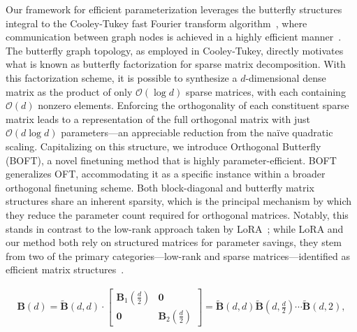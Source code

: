 Our framework for efficient parameterization leverages the butterfly structures integral to the Cooley-Tukey fast Fourier transform algorithm~\cite{cooley1965algorithm}, where communication between graph nodes is achieved in a highly efficient manner~\cite{klasing1994broadcasting}. The butterfly graph topology, as employed in Cooley-Tukey, directly motivates what is known as butterfly factorization for sparse matrix decomposition. With this factorization scheme, it is possible to synthesize a $d$-dimensional dense matrix as the product of only $\mathcal{O}(\log d)$ sparse matrices, with each containing $\mathcal{O}(d)$ nonzero elements. Enforcing the orthogonality of each constituent sparse matrix leads to a representation of the full orthogonal matrix with just $\mathcal{O}(d\log d)$ parameters—an appreciable reduction from the naïve quadratic scaling. Capitalizing on this structure, we introduce Orthogonal Butterfly (BOFT), a novel finetuning method that is highly parameter-efficient. BOFT generalizes OFT, accommodating it as a specific instance within a broader orthogonal finetuning scheme. Both block-diagonal and butterfly matrix structures share an inherent sparsity, which is the principal mechanism by which they reduce the parameter count required for orthogonal matrices. Notably, this stands in contrast to the low-rank approach taken by LoRA~\cite{hulora2022}; while LoRA and our method both rely on structured matrices for parameter savings, they stem from two of the primary categories—low-rank and sparse matrices—identified as efficient matrix structures~\cite{candes2011robust}.

\begin{equation}
\begin{aligned}
    \!\!\bm{B}(d)=\tilde{\bm{B}}(d,d)\!\cdot\!\begin{bmatrix}
    \bm{B}_1(\frac{d}{2})\!\!\!\!\! & \bm{0} \\
    \bm{0}\!\!\!\!\! &\bm{B}_2(\frac{d}{2})
    \end{bmatrix}= \tilde{\bm{B}}(d,d)\tilde{\bm{B}}(d,\frac{d}{2})\cdots\tilde{\bm{B}}(d,2),
\end{aligned}
\end{equation}

